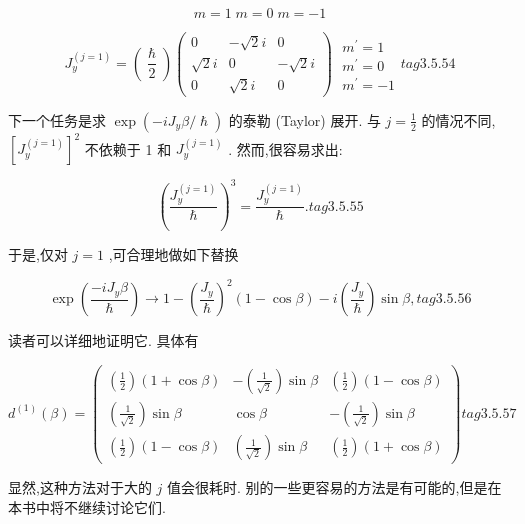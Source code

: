 $$
m = 1\;m = 0\;m = - 1
$$

$$
{J}_{y}^{\left( j = 1\right) } = \left( \frac{\hslash }{2}\right) \left( \begin{matrix} 0 & - \sqrt{2}i & 0 \\ \sqrt{2}i & 0 & - \sqrt{2}i \\ 0 & \sqrt{2}i & 0 \end{matrix}\right) \;\begin{array}{l} {m}^{\prime } = 1 \\ {m}^{\prime } = 0 \\ {m}^{\prime } = - 1 \end{array} tag{3. 5.54}
$$

下一个任务是求 $\exp \left( {-i{J}_{y}\beta /\hslash }\right)$ 的泰勒 (Taylor) 展开. 与 $j = \frac{1}{2}$ 的情况不同, ${\left\lbrack {J}_{y}^{\left( j = 1\right) }\right\rbrack }^{2}$ 不依赖于 1 和 ${J}_{y}^{\left( j = 1\right) }$ . 然而,很容易求出:

$$
{\left( \frac{{J}_{y}^{\left( j = 1\right) }}{\hslash }\right) }^{3} = \frac{{J}_{y}^{\left( j = 1\right) }}{\hslash }. tag{3. 5.55}
$$

于是,仅对 $j = 1$ ,可合理地做如下替换

$$
\exp \left( \frac{-i{J}_{y}\beta }{\hslash }\right) \rightarrow 1 - {\left( \frac{{J}_{y}}{\hslash }\right) }^{2}\left( {1 - \cos \beta }\right) - i\left( \frac{{J}_{y}}{\hslash }\right) \sin \beta , tag{3. 5.56}
$$

读者可以详细地证明它. 具体有

$$
{d}^{\left( 1\right) }\left( \beta \right) = \left( \begin{matrix} \left( \frac{1}{2}\right) \left( {1 + \cos \beta }\right) & - \left( \frac{1}{\sqrt{2}}\right) \sin \beta & \left( \frac{1}{2}\right) \left( {1 - \cos \beta }\right) \\ \left( \frac{1}{\sqrt{2}}\right) \sin \beta & \cos \beta & - \left( \frac{1}{\sqrt{2}}\right) \sin \beta \\ \left( \frac{1}{2}\right) \left( {1 - \cos \beta }\right) & \left( \frac{1}{\sqrt{2}}\right) \sin \beta & \left( \frac{1}{2}\right) \left( {1 + \cos \beta }\right) \end{matrix}\right) tag{3. 5.57}
$$

显然,这种方法对于大的 $j$ 值会很耗时. 别的一些更容易的方法是有可能的,但是在本书中将不继续讨论它们.

\ifx\allfiles\undefined

	\else
	\fi
